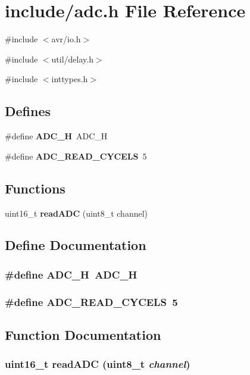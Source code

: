 \section{include/adc.h File Reference}
\label{adc_8h}
{\ttfamily \#include $<$avr/io.h$>$}\par
{\ttfamily \#include $<$util/delay.h$>$}\par
{\ttfamily \#include $<$inttypes.h$>$}\par
\subsection*{Defines}
\begin{DoxyCompactItemize}
\item 
\#define {\bf ADC\_\-H}~ADC\_\-H
\item 
\#define {\bf ADC\_\-READ\_\-CYCELS}~5
\end{DoxyCompactItemize}
\subsection*{Functions}
\begin{DoxyCompactItemize}
\item 
uint16\_\-t {\bf readADC} (uint8\_\-t channel)
\end{DoxyCompactItemize}


\subsection{Define Documentation}
\subsubsection[{ADC\_\-H}]{\setlength{\rightskip}{0pt plus 5cm}\#define ADC\_\-H~ADC\_\-H}\label{adc_8h_a7d45c6fd49da9ab97ff07bff1c3ddee5}
\subsubsection[{ADC\_\-READ\_\-CYCELS}]{\setlength{\rightskip}{0pt plus 5cm}\#define ADC\_\-READ\_\-CYCELS~5}\label{adc_8h_a4d2b3fe7091279727b389444ac7cd959}


\subsection{Function Documentation}
\subsubsection[{readADC}]{\setlength{\rightskip}{0pt plus 5cm}uint16\_\-t readADC (uint8\_\-t {\em channel})}\label{adc_8h_a812736491523e54e6bf10a142821e7fe}
